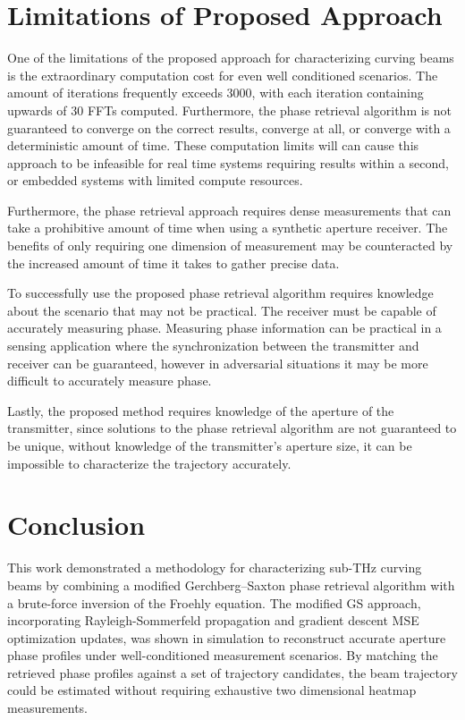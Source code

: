 \documentclass[11pt]{IEEEtran}
\begin{document}
\section{Limitations of Proposed Approach}

One of the limitations of the proposed approach for characterizing curving beams is the extraordinary computation cost for even well conditioned scenarios.
The amount of iterations frequently exceeds 3000, with each iteration containing upwards of 30 FFTs computed.
Furthermore, the phase retrieval algorithm is not guaranteed to converge on the correct results, converge at all, or converge with a deterministic amount of time.
These computation limits will can cause this approach to be infeasible for real time systems requiring results within a second, or embedded systems with limited compute resources.

Furthermore, the phase retrieval approach requires dense measurements that can take a prohibitive amount of time when using a synthetic aperture receiver.
The benefits of only requiring one dimension of measurement may be counteracted by the increased amount of time it takes to gather precise data.

To successfully use the proposed phase retrieval algorithm requires knowledge about the scenario that may not be practical.
The receiver must be capable of accurately measuring phase.
Measuring phase information can be practical in a sensing application where the synchronization between the transmitter and receiver can be guaranteed, however in adversarial situations it may be more difficult to accurately measure phase.

Lastly, the proposed method requires knowledge of the aperture of the transmitter, since solutions to the phase retrieval algorithm are not guaranteed to be unique, without knowledge of the transmitter's aperture size, it can be impossible to characterize the trajectory accurately.

\section{Conclusion}

This work demonstrated a methodology for characterizing sub-THz curving beams by combining a modified Gerchberg--Saxton phase retrieval algorithm with a brute-force inversion of the Froehly equation.
The modified GS approach, incorporating Rayleigh-Sommerfeld propagation and gradient descent MSE optimization updates, was shown in simulation to reconstruct accurate aperture phase profiles under well-conditioned measurement scenarios.
By matching the retrieved phase profiles against a set of trajectory candidates, the beam trajectory could be estimated without requiring exhaustive two dimensional heatmap measurements.
\end{document}
